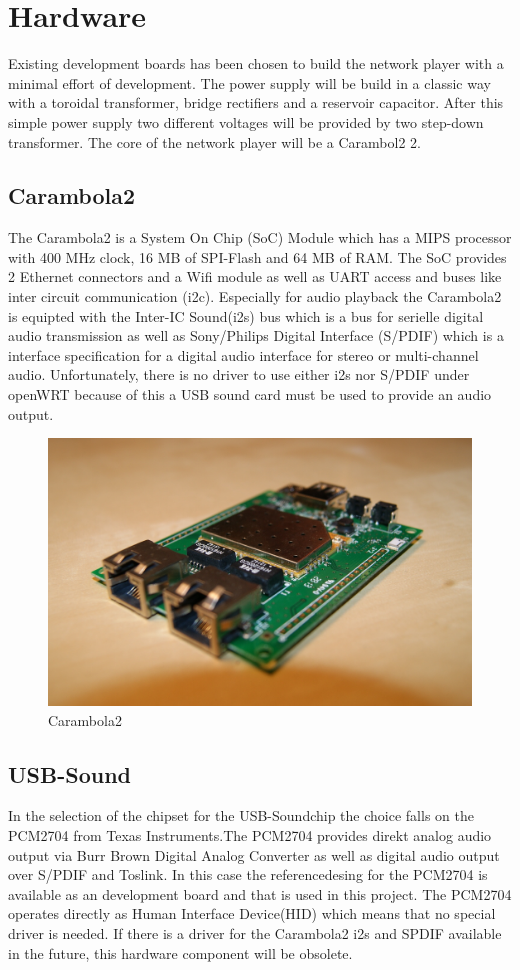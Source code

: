 \section{Hardware}
Existing development boards has been chosen to build the network player with a minimal  effort of development. The power supply will be build in a classic way with a toroidal transformer, bridge rectifiers and a reservoir capacitor. After this simple power supply two different voltages will be provided by two step-down transformer. The core of the network player will be a Carambol2 2.
\subsection{Carambola2}
The Carambola2 is a System On Chip (SoC) Module which has a MIPS processor with 400 MHz clock, 16 MB of SPI-Flash and 64 MB of RAM. The SoC provides 2 Ethernet connectors and a Wifi module as well as UART access and buses like inter circuit communication (i2c). Especially for audio playback the Carambola2 is equipted with the Inter-IC Sound(i2s) bus which is a bus for serielle digital audio transmission as well as Sony/Philips Digital Interface (S/PDIF) which is a interface specification for a digital audio interface for stereo or multi-channel audio. Unfortunately, there is no driver to use either i2s nor S/PDIF under openWRT because of this a USB sound card must be used to provide an audio output.
\begin{figure}[h!]
\begin{center}
\includegraphics[scale=0.4]{pictures/carambola2}
\caption{Carambola2}
\end{center}
\end{figure}
\subsection{USB-Sound}
In the selection of the chipset for the USB-Soundchip the choice falls on the PCM2704 from Texas Instruments.The PCM2704 provides direkt analog audio output via Burr Brown Digital Analog Converter as well as digital audio output over S/PDIF and Toslink. In this case the referencedesing for the PCM2704 is available as an development board and that is used in this project. The PCM2704 operates directly as Human Interface Device(HID) which means that no special driver is needed. If there is a driver for the Carambola2 i2s and SPDIF available in the future, this hardware component will be obsolete.

